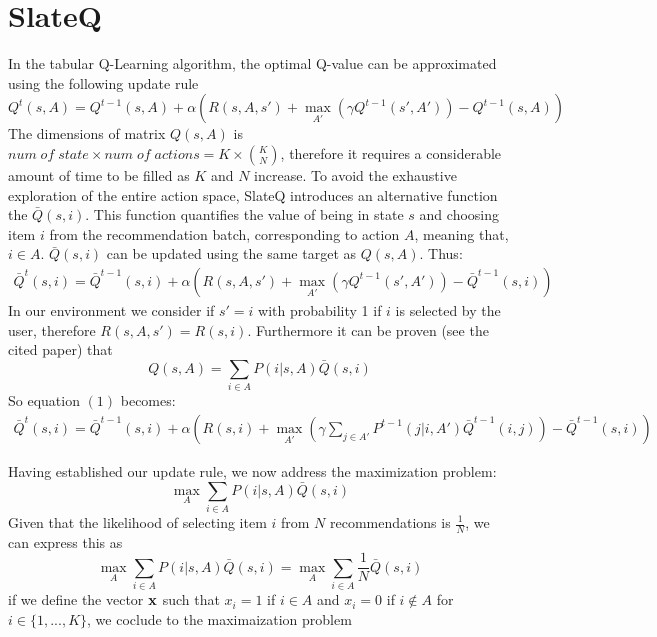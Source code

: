\documentclass[12pt]{article}
\begin{document}
\section*{{\bf SlateQ}}
In the tabular Q-Learning algorithm, the optimal Q-value can be approximated using the following update rule
$$Q^t(s,A) = Q^{t-1}(s,A) + \alpha\left(R(s,A,s') + \max_{A'}\left(\gamma Q^{t-1}(s',A')\right) - Q^{t-1}(s,A)\right)$$
The dimensions of matrix $Q(s,A)$ is $num\; of \; state\times num\;of\;actions = K\times {K \choose N}$, therefore it requires a considerable amount of time to be filled as $K$ and $N$ increase. 
To avoid the exhaustive exploration of the entire action space, SlateQ introduces an alternative function the $\bar{Q}(s,i)$. 
This function quantifies the value of being in state $s$ and choosing item $i$ from the recommendation batch, corresponding to action $A$, meaning that, $i\in A$.
$\bar{Q}(s,i)$ can be updated using the same target as $Q(s,A)$. Thus:
\begin{align*}
    \bar{Q}^t(s,i) = \bar{Q}^{t-1}(s,i) + \alpha\left(R(s,A,s') + \max_{A'}\left(\gamma Q^{t-1}(s',A')\right) - \bar{Q}^{t-1}(s,i)\right) \tag{1}
\end{align*}
    In our environment we consider if $s' = i$ with probability 1 if $i$ is selected by the user, therefore $R(s,A,s') = R(s,i)$. Furthermore it can be proven (see the cited paper) that 
$$Q(s,A) = \sum_{i\in A}P(i|s,A)\bar{Q}(s,i)$$
So equation $(1)$ becomes:
\begin{align*}
    \bar{Q}^t(s,i) = \bar{Q}^{t-1}(s,i) + \alpha\left(R(s,i) + \max_{A'}\left(\gamma \sum_{j\in A'}P^{t-1}(j|i,A')\bar{Q}^{t-1}(i,j)\right) - \bar{Q}^{t-1}(s,i)\right) 
\end{align*}

Having established our update rule, we now address the maximization problem:
$$\max_{A}\sum_{i\in A}P(i|s,A)\bar{Q}(s,i)$$
Given that the likelihood of selecting item $i$ from $N$ recommendations is $\frac{1}{N}$, we can express this as
$$\max_{A}\sum_{i\in A}P(i|s,A)\bar{Q}(s,i) = \max_{A}\sum_{i\in A}\frac{1}{N}\bar{Q}(s,i) $$
if we define the vector $\bf x$ such that $x_i= 1$ if $i\in A$ and $x_i = 0$
if $i \notin A$ for $i \in \{1,...,K\}$, we coclude to the maximaization problem
\end{document}

